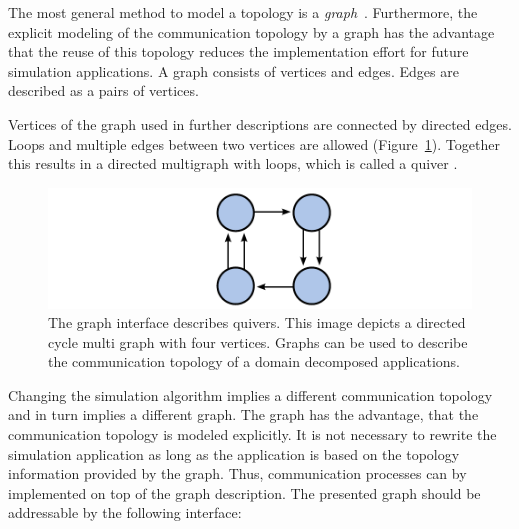 The most general method to model a topology is a
\emph{graph}~\cite{ref:graph}. Furthermore, the explicit modeling of
the communication topology by a graph has the advantage that the reuse
of this topology reduces the implementation effort for future
simulation applications.  A graph consists of vertices and
edges. Edges are described as a pairs of vertices.


Vertices of the graph used in further descriptions are connected by
directed edges.  Loops and multiple edges between two vertices are
allowed (Figure~\ref{fig:graph}). Together this results in a directed
multigraph with loops, which is called a quiver \cite{ref:quiver}.

\begin{figure}[H]
  \centering \includegraphics[width=\textwidth]{graphics/30_graph}
  \caption{The graph interface describes quivers. This image depicts a
    directed cycle multi graph with four vertices. Graphs can be used
    to describe the communication topology of a domain decomposed
    applications.}
  \label{fig:graph}
\end{figure}

\noindent Changing the simulation algorithm implies a different
communication topology and in turn implies a different graph. The
graph has the advantage, that the communication topology is
modeled explicitly. It is not necessary to rewrite the simulation
application as long as the application is based on the topology
information provided by the graph. Thus, communication processes can
by implemented on top of the graph description. The presented graph
should be addressable by the following interface:

